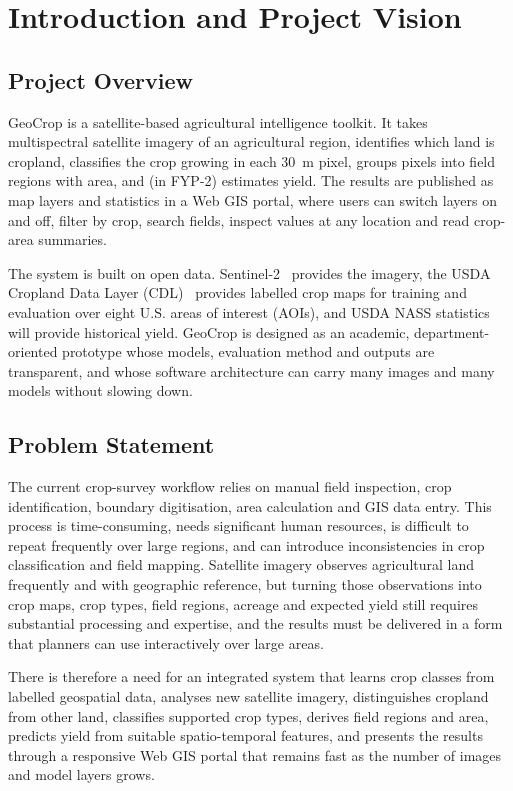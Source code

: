 \chapter{Introduction and Project Vision}

\section{Project Overview}
GeoCrop is a satellite-based agricultural intelligence toolkit. It takes multispectral satellite
imagery of an agricultural region, identifies which land is cropland, classifies the crop growing
in each 30~m pixel, groups pixels into field regions with area, and (in FYP-2) estimates yield. The
results are published as map layers and statistics in a Web GIS portal, where users can switch
layers on and off, filter by crop, search fields, inspect values at any location and read
crop-area summaries.

The system is built on open data. Sentinel-2~\cite{sentinel2} provides the imagery, the USDA Cropland Data Layer
(CDL)~\cite{cdlsite,lin2022,hao2020} provides labelled crop maps for training and evaluation over eight U.S.
areas of interest (AOIs), and USDA NASS statistics will provide historical yield. GeoCrop is designed
as an academic, department-oriented prototype whose models, evaluation method and outputs are
transparent, and whose software architecture can carry many images and many models without
slowing down.

\section{Problem Statement}
The current crop-survey workflow relies on manual field inspection, crop identification, boundary
digitisation, area calculation and GIS data entry. This process is time-consuming, needs significant
human resources, is difficult to repeat frequently over large regions, and can introduce
inconsistencies in crop classification and field mapping. Satellite imagery observes agricultural
land frequently and with geographic reference, but turning those observations into crop maps,
crop types, field regions, acreage and expected yield still requires substantial processing and
expertise, and the results must be delivered in a form that planners can use interactively over
large areas.

There is therefore a need for an integrated system that learns crop classes from labelled
geospatial data, analyses new satellite imagery, distinguishes cropland from other land, classifies
supported crop types, derives field regions and area, predicts yield from suitable spatio-temporal
features, and presents the results through a responsive Web GIS portal that remains fast as the
number of images and model layers grows.

